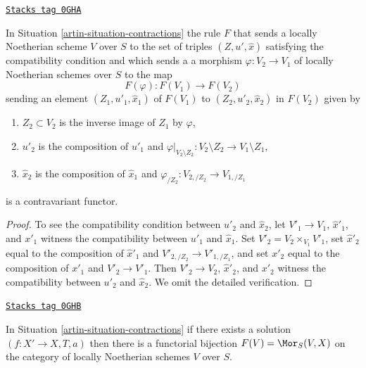 \begin{lemma}[Functor]
\label{artin-lemma-functor}
\href{https://stacks.math.columbia.edu/tag/0GHA}{\texttt{Stacks tag 0GHA}}

In Situation \ref{artin-situation-contractions} the rule $F$ that sends
a locally Noetherian scheme $V$ over $S$ to the set of triples
$(Z, u', \hat x)$ satisfying the compatibility condition and which sends a
a morphism $\varphi : V_2 \to V_1$ of locally Noetherian schemes over $S$
to the map
$$
F(\varphi) : F(V_1) \longrightarrow F(V_2)
$$
sending an element $(Z_1, u'_1, \hat x_1)$ of $F(V_1)$ to
$(Z_2, u'_2, \hat x_2)$ in $F(V_2)$ given by
\begin{enumerate}
\item $Z_2 \subset V_2$ is the inverse image of $Z_1$ by $\varphi$,
\item $u'_2$ is the composition of $u'_1$ and
$\varphi|_{V_2 \setminus Z_2} : V_2 \setminus Z_2 \to V_1 \setminus Z_1$,
\item $\hat x_2$ is the composition of $\hat x_1$ and
$\varphi_{/Z_2} : V_{2, /Z_2} \to V_{1, /Z_1}$
\end{enumerate}
is a contravariant functor.
\end{lemma}

\begin{proof}
To see the compatibility condition between $u'_2$ and $\hat x_2$, let
$V'_1 \to V_1$, $\hat x'_1$, and $x'_1$ witness the compatibility between
$u'_1$ and $\hat x_1$. Set $V'_2 = V_2 \times_{V_1} V'_1$, set
$\hat x'_2$ equal to the composition of $\hat x'_1$ and
$V'_{2, /Z_2} \to V'_{1, /Z_1}$, and set $x'_2$
equal to the composition of $x'_1$ and $V'_2 \to V'_1$.
Then $V'_2 \to V_2$, $\hat x'_2$, and $x'_2$ witness the compatibility between
$u'_2$ and $\hat x_2$. We omit the detailed verification.
\end{proof}

\begin{lemma}[Solution]
\label{artin-lemma-solution}
\href{https://stacks.math.columbia.edu/tag/0GHB}{\texttt{Stacks tag 0GHB}}

In Situation \ref{artin-situation-contractions} if there exists a solution
$(f : X' \to X, T, a)$ then there is a functorial bijection
$F(V) = \Mor_S(V, X)$ on the category of
locally Noetherian schemes $V$ over $S$.
\end{lemma}

